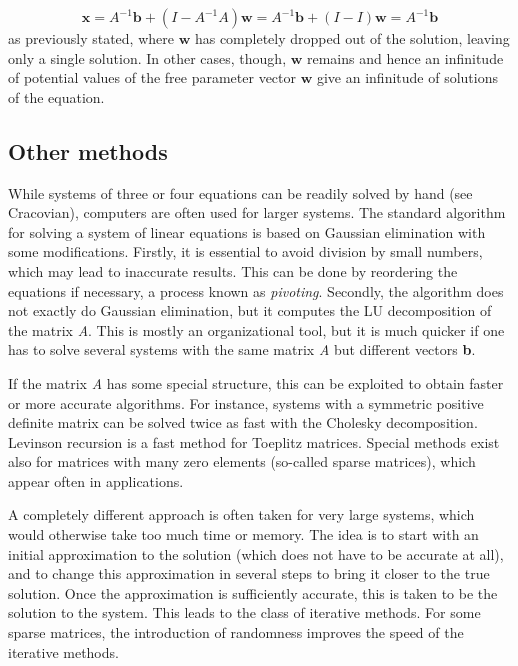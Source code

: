 $$\mathbf{x}=A^{-1}\mathbf{b} + \left(I - A^{-1}A\right)\mathbf{w} = A^{-1}\mathbf{b} +
\left(I-I\right)\mathbf{w} = A^{-1}\mathbf{b}$$ as previously stated, where $\mathbf{w}$
has completely dropped out of the solution, leaving only a single solution. In other
cases, though, $\mathbf{w}$ remains and hence an infinitude of potential values of the
free parameter vector $\mathbf{w}$ give an infinitude of solutions of the equation.




\subsection{Other methods}
\label{sss:othe-5ecc}




While systems of three or four equations can be readily solved by hand (see Cracovian),
computers are often used for larger systems. The standard algorithm for solving a system
of linear equations is based on Gaussian elimination with some modifications. Firstly, it
is essential to avoid division by small numbers, which may lead to inaccurate results.
This can be done by reordering the equations if necessary, a process known as
\textit{pivoting}. Secondly, the algorithm does not exactly do Gaussian elimination, but
it computes the LU decomposition of the matrix \textit{A}. This is mostly an
organizational tool, but it is much quicker if one has to solve several systems with the
same matrix \textit{A} but different vectors \textbf{b}.



If the matrix \textit{A} has some special structure, this can be exploited to obtain
faster or more accurate algorithms. For instance, systems with a symmetric positive
definite matrix can be solved twice as fast with the Cholesky decomposition. Levinson
recursion is a fast method for Toeplitz matrices. Special methods exist also for matrices
with many zero elements (so-called sparse matrices), which appear often in applications.



A completely different approach is often taken for very large systems, which would
otherwise take too much time or memory. The idea is to start with an initial approximation
to the solution (which does not have to be accurate at all), and to change this
approximation in several steps to bring it closer to the true solution. Once the
approximation is sufficiently accurate, this is taken to be the solution to the system.
This leads to the class of iterative methods. For some sparse matrices, the introduction
of randomness improves the speed of the iterative methods.



